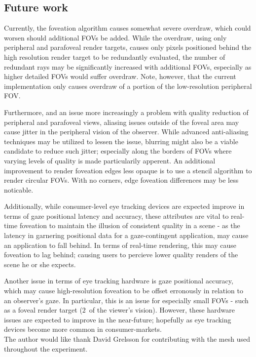 \subsection{Future work}
Currently, the foveation algorithm causes somewhat severe overdraw, which could worsen should additional FOVs be added.
While the overdraw, using only peripheral and parafoveal render targets, causes only pixels positioned behind the high resolution render target to be redundantly evaluated, the number of redundant rays may be significantly increased with additional FOVs, especially as higher detailed FOVs would suffer overdraw.
Note, however, that the current implementation only causes overdraw of a portion of the low-resolution peripheral FOV.

Furthermore, and an issue more increasingly a problem with quality reduction of peripheral and parafoveal views, aliasing issues outside of the foveal area may cause jitter in the peripheral vision of the observer.
While advanced anti-aliasing techniques may be utilized to lessen the issue, blurring might also be a viable candidate to reduce such jitter; especially along the borders of FOVs where varying levels of quality is made particularily apperent.
An additional improvement to render foveation edges less opaque is to use a stencil algorithm to render circular FOVs.
With no corners, edge foveation differences may be less noticable.

Additionally, while consumer-level eye tracking devices are expected improve in terms of gaze positional latency and accuracy, these attributes are vital to real-time foveation to maintain the illusion of consistent quality in a scene - as the latency in garnering positional data for a gaze-contingent application, may cause an application to fall behind.
In terms of real-time rendering, this may cause foveation to lag behind; causing users to percieve lower quality renders of the scene he or she expects.

Another issue in terms of eye tracking hardware is gaze positional accuracy, which may cause high-resolution foveation to be offset erronously in relation to an observer's gaze.
In particular, this is an issue for especially small FOVs - such as a foveal render target ($2$\degree\ of the viewer's vision).
However, these hardware issues are expected to improve in the near-future; hopefully as eye tracking devices become more common in consumer-markets.\\

\noindent
The author would like thank David Grelsson for contributing with the mesh used throughout the experiment.
